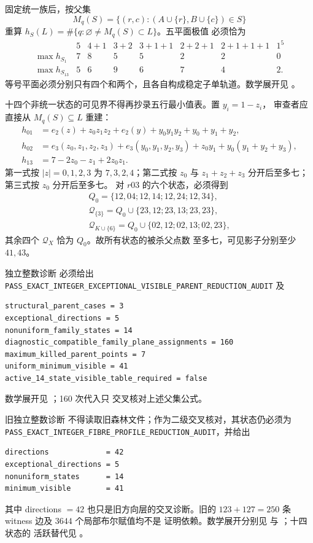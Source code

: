 固定统一族后，按父集
\[
M_q(S)=\{(r,c):(A\cup\{r\},B\cup\{c\})\in S\}
\]
重算 \(h_S(L)=\#\{q:\varnothing\ne M_q(S)\subset L\}\)。五平面极值
必须恰为
\[
\begin{array}{c|rrrrrrr}
&5&4+1&3+2&3+1+1&2+2+1&2+1+1+1&1^5\\ \hline
\max h_{S_1}&7&8&5&5&2&2&0\\
\max h_{S_{13}}&5&6&9&6&7&4&2.
\end{array}
\]
等号平面必须分别只有四个和两个，且各自构成稳定子单轨道。数学展开见
。

十四个非统一状态的可见界不得再抄录五行最小值表。置 \(y_i=1-z_i\)，
审查者应直接从 \(M_q(S)\subseteq L\) 重建：
\[
\begin{aligned}
h_{01}&=e_2(z)+z_0z_1z_2+e_2(y)+y_0y_1y_2+y_0+y_1+y_2,\\
h_{02}&=e_3(z_0,z_1,z_2,z_3)+e_3(y_0,y_1,y_2,y_3)
       +z_0y_1+y_0(y_1+y_2+y_3),\\
h_{13}&=7-2z_0-z_1+2z_0z_1 .
\end{aligned}
\]
第一式按 \(|z|=0,1,2,3\) 为 \(7,3,2,4\)；第二式按 \(z_0\) 与
\(z_1+z_2+z_3\) 分开后至多七；第三式按 \(z_0\) 分开后至多七。
对 \(r03\) 的六个状态，必须得到
\[
\begin{gathered}
Q_0=\{12,04;12,14;12,24;12,34\},\\
\mathcal Q_{\{3\}}=Q_0\cup\{23,12;23,13;23,23\},\\
\mathcal Q_{K\cup\{6\}}=Q_0\cup\{02,12;02,13;02,23\},
\end{gathered}
\]
其余四个 \(\mathcal Q_X\) 恰为 \(Q_0\)。故所有状态的被杀父点数
至多七，可见影子分别至少 \(41,43\)。

独立整数诊断
必须给出
\texttt{PASS\_EXACT\_INTEGER\_EXCEPTIONAL\_VISIBLE\_PARENT\_REDUCTION\_AUDIT}
及
\begin{verbatim}
structural_parent_cases = 3
exceptional_directions = 5
nonuniform_family_states = 14
diagnostic_compatible_family_plane_assignments = 160
maximum_killed_parent_points = 7
uniform_minimum_visible = 41
active_14_state_visible_table_required = false
\end{verbatim}
数学展开见
；160 次代入只
交叉核对上述父集公式。

旧独立整数诊断
不得读取旧森林文件；作为二级交叉核对，其状态仍必须为
\nolinkurl{PASS_EXACT_INTEGER_FIBRE_PROFILE_REDUCTION_AUDIT}，并给出
\begin{verbatim}
directions             = 42
exceptional_directions = 5
nonuniform_states      = 14
minimum_visible        = 41
\end{verbatim}
其中 directions \(=42\) 也只是旧方向层的交叉诊断。旧的
\(123+127=250\) 条 witness 边及 \(3644\) 个局部布尔赋值均不是
证明依赖。数学展开分别见
 与
；十四状态的
活跃替代见
。

